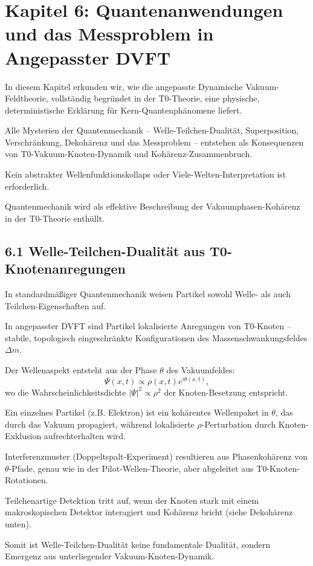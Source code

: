 	\section{Kapitel 6: Quantenanwendungen und das Messproblem in Angepasster DVFT}
	
	In diesem Kapitel erkunden wir, wie die angepasste Dynamische Vakuum-Feldtheorie, vollständig begründet in der T0-Theorie, eine physische, deterministische Erklärung für Kern-Quantenphänomene liefert.
	
	Alle Mysterien der Quantenmechanik – Welle-Teilchen-Dualität, Superposition, Verschränkung, Dekohärenz und das Messproblem – entstehen als Konsequenzen von T0-Vakuum-Knoten-Dynamik und Kohärenz-Zusammenbruch.
	
	Kein abstrakter Wellenfunktionskollaps oder Viele-Welten-Interpretation ist erforderlich.
	
	Quantenmechanik wird als effektive Beschreibung der Vakuumphasen-Kohärenz in der T0-Theorie enthüllt.
	
	\subsection{6.1 Welle-Teilchen-Dualität aus T0-Knotenanregungen}
	
	In standardmäßiger Quantenmechanik weisen Partikel sowohl Welle- als auch Teilchen-Eigenschaften auf.
	
	In angepasster DVFT sind Partikel lokalisierte Anregungen von T0-Knoten – stabile, topologisch eingeschränkte Konfigurationen des Massenschwankungsfeldes $\Delta m$.
	
	Der Wellenaspekt entsteht aus der Phase $\theta$ des Vakuumfeldes:
	\[
	\Psi(x,t) \propto \rho(x,t) e^{i\theta(x,t)},
	\]
	wo die Wahrscheinlichkeitsdichte $|\Psi|^2 \propto \rho^2$ der Knoten-Besetzung entspricht.
	
	Ein einzelnes Partikel (z.B. Elektron) ist ein kohärentes Wellenpaket in $\theta$, das durch das Vakuum propagiert, während lokalisierte $\rho$-Perturbation durch Knoten-Exklusion aufrechterhalten wird.
	
	Interferenzmuster (Doppeltspalt-Experiment) resultieren aus Phasenkohärenz von $\theta$-Pfade, genau wie in der Pilot-Wellen-Theorie, aber abgeleitet aus T0-Knoten-Rotationen.
	
	Teilchenartige Detektion tritt auf, wenn der Knoten stark mit einem makroskopischen Detektor interagiert und Kohärenz bricht (siehe Dekohärenz unten).
	
	Somit ist Welle-Teilchen-Dualität keine fundamentale Dualität, sondern Emergenz aus unterliegender Vakuum-Knoten-Dynamik.
	
